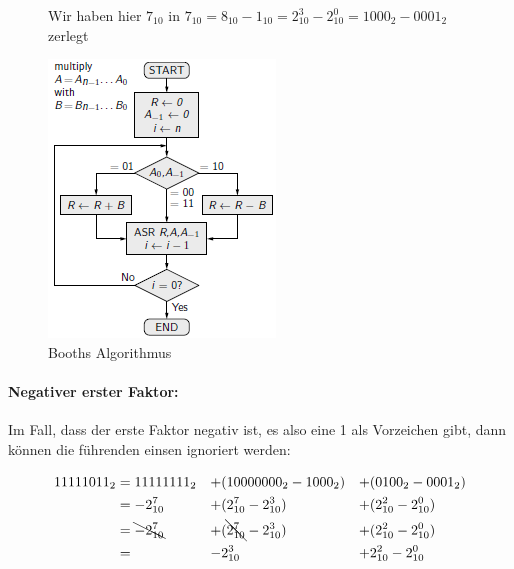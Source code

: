 \documentclass[12pt]{report}
\begin{document}
\begin{figure}[H]
\begin{minipage}[t]{0.6\textwidth}
    Wir haben hier $7_{10}$ in $7_{10} = 8_{10}-1_{10} = 2^3_{10} - 2^0_{10} = 1000_2 - 0001_2$ zerlegt
    
  \end{minipage}
  \hfill
  \begin{minipage}[t]{0.3\textwidth}
    \caption{Booths Algorithmus}
    \label{fig:booths-multiplikationsalgorithmus}
    \begin{center}
      \includegraphics[width=\textwidth]{booths-multiplikationsalgorithmus}
    \end{center}
  \end{minipage}
\end{figure}

\paragraph{Negativer erster Faktor:}

Im Fall, dass der erste Faktor negativ ist, es also eine 1 als Vorzeichen gibt, dann können die führenden einsen ignoriert werden:

\begin{alignat*}{3}
  11111011_2 
   & = 11111111_2          & + & (10000000_2 - 1000_2)           & + & (0100_2 - 0001_2)     \\
   & = -2^7_{10}           & + & (2^7_{10} - 2^3_{10})           & + & (2^2_{10} - 2^0_{10}) \\
   & = \bcancel{-2^7_{10}} & + & (\bcancel{2^7_{10}} - 2^3_{10}) & + & (2^2_{10} - 2^0_{10}) \\
   & =   \                 & - & 2^3_{10}                        & + & 2^2_{10} - 2^0_{10}
\end{alignat*}
\end{document}
